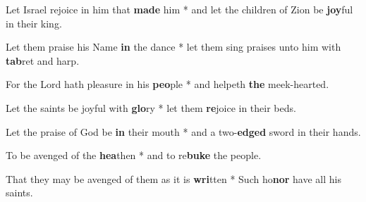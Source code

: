 \begin{multicols}{2}
	Let Israel rejoice in him that \textbf{made} him * and let the children of Zion be \textbf{joy}ful in their king.
	
	Let them praise his Name \textbf{in} the dance * let them sing praises unto him with \textbf{tab}ret and harp.
	
	For the Lord hath pleasure in his \textbf{peo}ple * and helpeth \textbf{the} meek-hearted.
	
	Let the saints be joyful with \textbf{glo}ry * let them \textbf{re}joice in their beds.
	
	Let the praise of God be \textbf{in} their mouth * and a two-\textbf{edged} sword in their hands.
	
	To be avenged of the \textbf{hea}then * and to re\textbf{buke} the people.
	
	That they may be avenged of them as it is \textbf{wri}tten * Such ho\textbf{nor} have all his saints.
\end{multicols}